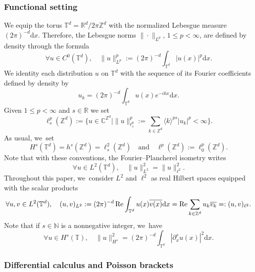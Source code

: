 \documentclass[10pt]{amsart}
\let\ts\textstyle
\theoremstyle{plain}
\theoremstyle{definition}
\newcommand{\1}{\mathbf{1}}
\begin{document}
\subsubsection{Functional setting}
\label{sec:fun}
We equip the torus $\mathbb{T}^d = \mathbb{R}^d / 2\pi \mathbb{Z}^d$ with the normalized Lebesgue measure $(2\pi)^{-d}\mathrm{d}x$. Therefore, the Lebesgue norms $\|\cdot\|_{L^p}$, $1\leq p<\infty$, are defined by density through the formula\vspace*{-3pt}
\[
\forall u \in C^0(\mathbb{T}^d), \quad \| u\|_{L^p}^p:= (2\pi)^{-d}\int_{\mathbb{T}^d} |u(x)|^p \mathrm{d}x.
\]
We identity each distribution $u$ on $\mathbb{T}^d$ with the sequence of its Fourier coefficients defined by density by\vspace*{-3pt}
\[
u_k = (2\pi)^{-d} \int_{\mathbb{T}^d} u(x) e^{-ikx} \mathrm{d}x.
\]
Given $1\leq p < \infty$ and $s\in \mathbb{R}$ we set
\[
\ts
\ell^{p}_s(\mathbb{Z}^d):= \bigl\{ u\in \mathbb{C}^{\mathbb{Z}^d} \mid \|u\|_{\ell^p_s}^p := \sum_{k\in \mathbb{Z}^d} \langle k \rangle^{ps} |u_k|^p <\infty \bigr\}.
\]
As usual, we~set
\[
H^s(\mathbb{T}^d) = h^s(\mathbb{Z}^d) = \ell^2_s(\mathbb{Z}^d) \quad \mathrm{and} \quad \ell^p(\mathbb{Z}^d) := \ell^p_0(\mathbb{Z}^d).
\]
Note that with these conventions, the Fourier--Plancherel isometry writes
\[
\forall u \in L^2(\mathbb{T}^d), \quad \| u\|_{L^2}^2 = \|u\|_{\ell^2}^2.
\]
Throughout this paper, we~consider $L^2$ and $\ell^2$ as real Hilbert spaces equipped with the scalar products
\[
\forall u,v\in L^2(\mathbb{T}^d), \quad (u,v)_{L^2} :=(2\pi)^{-d} \operatorname{Re} \int_{\mathbb{T}^d} u(x) \overline{v(x)} \mathrm{d}x = \operatorname{Re} \sum_{k\in \mathbb{Z}^d} u_k \overline{v_k} =: (u,v)_{\ell^2}.
\]
Note that if $s \in \mathbb{N}$ is a nonnegative integer, we~have
\[
\forall u \in H^s(\mathbb{T}), \quad \|u\|_{H^s}^2 = (2\pi)^{-d} \int_{\mathbb{T}^d} |\partial_x^s u(x)|^2 \mathrm{d}x.
\]

\subsubsection{Differential calculus and Poisson brackets}
\end{document}
